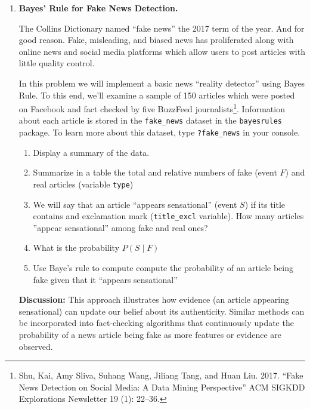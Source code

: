 \documentclass[12pt]{article}
\begin{document}
\begin{enumerate}
\begin{enumerate}
        \item \textbf{Interpretation.}
        Given that the polling system predicts \textbf{High-Probability (HP)}, there is approximately a \(60\%\) chance that Party A will win the election. This highlights the predictive strength of the political forecast system.
    \end{enumerate}
    \fi \color{black}  
        
    \item \textbf{Bayes' Rule for Fake News Detection.} 
    
    The Collins Dictionary named “fake news” the 2017 term of the year. And for good reason. Fake, misleading, and biased news has proliferated along with online news and social media platforms which allow users to post articles with little quality control. 
    
    In this problem we will implement a basic news ``reality detector'' using Bayes Rule. To this end, we’ll examine a sample of 150 articles which were posted on Facebook and fact checked by five BuzzFeed journalists\footnote{Shu, Kai, Amy Sliva, Suhang Wang, Jiliang Tang, and Huan Liu. 2017. ``Fake News Detection on Social Media: A Data Mining Perspective'' ACM SIGKDD Explorations Newsletter 19 (1): 22–36.}. Information about each article is stored in the \texttt{fake\_news} dataset in the \texttt{bayesrules} package. To learn more about this dataset, type \texttt{?fake\_news} in your console.

    \begin{enumerate}[label=(\alph*)]
        \item Display a summary of the data.
        \item Summarize in a table the total and relative numbers of fake (event $F$) and real articles (variable \texttt{type})
        \item We will say that an article ``appears sensational'' (event $S$) if its title contains and exclamation mark (\texttt{title\_excl} variable). How many articles ''appear sensational'' among fake and real ones?
        \item What is the probability $P(S \mid F)$
        \item Use Baye's rule to compute compute the probability of an article being fake given that it ``appears sensational''
    \end{enumerate}

    \textbf{Discussion:}  
    This approach illustrates how evidence (an article appearing sensational) can update our belief about its authenticity. Similar methods can be incorporated into fact-checking algorithms that continuously update the probability of a news article being fake as more features or evidence are observed.
    

\end{enumerate}
\end{document}
